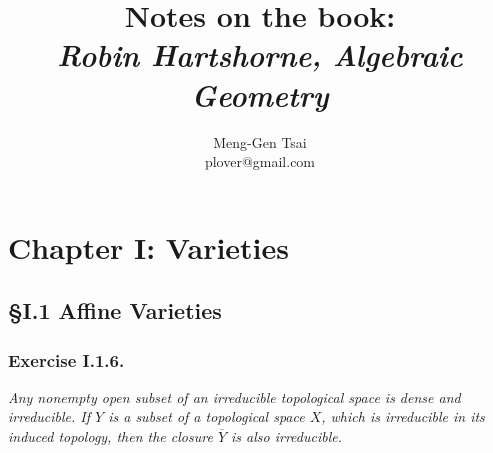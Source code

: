 \documentclass{article}
\title{\textbf{Notes on the book: \\ \emph{Robin Hartshorne, Algebraic Geometry}}}
\author{Meng-Gen Tsai \\ plover@gmail.com}
\begin{document}
\maketitle
\tableofcontents












\newpage
\section*{Chapter I: Varieties \\}



\subsection*{\S I.1 Affine Varieties \\}



\subsubsection*{Exercise I.1.6.}
\emph{Any nonempty open subset of an irreducible topological space is dense and irreducible.
If $Y$ is a subset of a topological space $X$, which is irreducible in its induced topology,
then the closure $\overline{Y}$ is also irreducible.} \\
\end{document}
